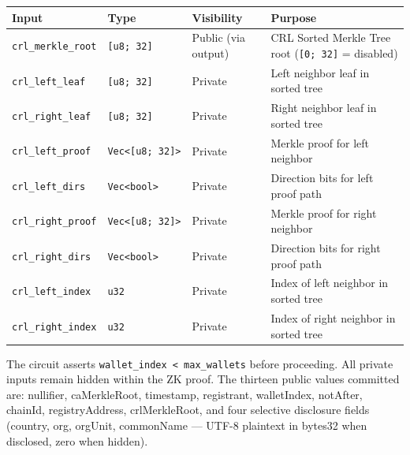 \documentclass[11pt, a4paper]{article}
\begin{document}
\begin{longtable}[]{@{}
  >{\raggedright\arraybackslash}p{}
  >{\raggedright\arraybackslash}p{}
  >{\raggedright\arraybackslash}p{}
  >{\raggedright\arraybackslash}p{}@{}}
\toprule\noalign{}
\begin{minipage}[b]{\linewidth}\raggedright
Input
\end{minipage} & \begin{minipage}[b]{\linewidth}\raggedright
Type
\end{minipage} & \begin{minipage}[b]{\linewidth}\raggedright
Visibility
\end{minipage} & \begin{minipage}[b]{\linewidth}\raggedright
Purpose
\end{minipage} \\
\midrule\noalign{}
\endhead
\bottomrule\noalign{}
\endlastfoot
\texttt{crl\_merkle\_root} & \texttt{{[}u8;\ 32{]}} & Public (via
output) & CRL Sorted Merkle Tree root (\texttt{{[}0;\ 32{]}} =
disabled) \\
\texttt{crl\_left\_leaf} & \texttt{{[}u8;\ 32{]}} & Private & Left
neighbor leaf in sorted tree \\
\texttt{crl\_right\_leaf} & \texttt{{[}u8;\ 32{]}} & Private & Right
neighbor leaf in sorted tree \\
\texttt{crl\_left\_proof} &
\texttt{Vec\textless{}{[}u8;\ 32{]}\textgreater{}} & Private & Merkle
proof for left neighbor \\
\texttt{crl\_left\_dirs} & \texttt{Vec\textless{}bool\textgreater{}} &
Private & Direction bits for left proof path \\
\texttt{crl\_right\_proof} &
\texttt{Vec\textless{}{[}u8;\ 32{]}\textgreater{}} & Private & Merkle
proof for right neighbor \\
\texttt{crl\_right\_dirs} & \texttt{Vec\textless{}bool\textgreater{}} &
Private & Direction bits for right proof path \\
\texttt{crl\_left\_index} & \texttt{u32} & Private & Index of left
neighbor in sorted tree \\
\texttt{crl\_right\_index} & \texttt{u32} & Private & Index of right
neighbor in sorted tree \\
\end{longtable}

The circuit asserts \texttt{wallet\_index\ \textless{}\ max\_wallets}
before proceeding. All private inputs remain hidden within the ZK proof.
The thirteen public values committed are: nullifier, caMerkleRoot,
timestamp, registrant, walletIndex, notAfter, chainId, registryAddress,
crlMerkleRoot, and four selective disclosure fields (country,
org, orgUnit, commonName --- UTF-8 plaintext in bytes32 when
disclosed, zero when hidden).
\end{document}
